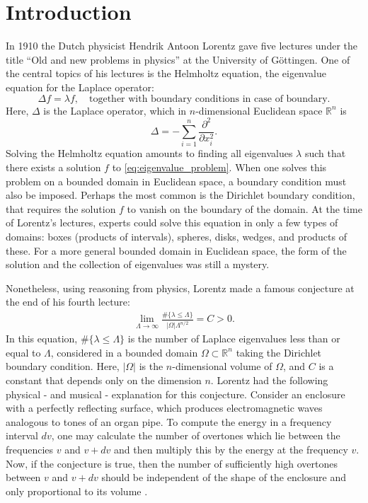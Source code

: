 \documentclass{amsart}
\theoremstyle{definition}
\def\beq{\begin{eqnarray}}
\def\eeq{\end{eqnarray}}
\newcommand*{\R}{\mathbb{R}}
\begin{document}
\section{Introduction} \label{sec:introduction}
In 1910 the Dutch physicist Hendrik Antoon Lorentz gave five lectures under the title ``Old and new problems in physics'' at the University of Göttingen.  One of the central topics of his lectures is the Helmholtz equation, the eigenvalue equation for the Laplace operator:  \begin{equation} \label{eq:eigenvalue_problem}
    \Delta f = \lambda f, \quad \textrm{together with boundary conditions in case of boundary.}
\end{equation}
Here, $\Delta$ is the Laplace operator, which in $n$-dimensional Euclidean space $\R^n$ is 
\begin{equation} \label{eq:Laplace_R^n}
    \Delta = -\sum_{i=1}^n \frac{\partial^2}{\partial x_i^2}.
\end{equation}
Solving the Helmholtz equation amounts to finding all eigenvalues $\lambda$ such that there exists a solution $f$ to \eqref{eq:eigenvalue_problem}.  When one solves this problem on a bounded domain in Euclidean space, a boundary condition must also be imposed.  Perhaps the most common is the Dirichlet boundary condition, that requires the solution $f$ to vanish on the boundary of the domain.  At the time of Lorentz's lectures, experts could solve this equation in only a few types of domains:  boxes (products of intervals), spheres, disks, wedges, and products of these.  For a more general bounded domain in Euclidean space, the form of the solution and the collection of eigenvalues was still a mystery.       

Nonetheless, using reasoning from physics, Lorentz made a famous conjecture at the end of his fourth lecture:  
\beq \lim_{\Lambda \to \infty} \frac{ \# \{ \lambda \leq \Lambda\} }{|\Omega| \Lambda^{n/2}} = C > 0. \label{eq:lorentzs_con} 
\eeq 
In this equation, $\# \{ \lambda \leq \Lambda\}$ is the number of Laplace eigenvalues less than or equal to $\Lambda$, considered in a bounded domain $\Omega \subset \R^n$ taking the Dirichlet boundary condition.  Here, $|\Omega|$ is the $n$-dimensional volume of $\Omega$, and $C$ is a constant that depends only on the dimension $n$.  Lorentz had the following physical - and musical - explanation for this conjecture. Consider an enclosure with a perfectly reflecting surface, which produces electromagnetic waves analogous to tones of an organ pipe. To compute the energy in a frequency interval $dv$, one may calculate the number of overtones which lie between the frequencies $v$ and $v+dv$ and then multiply this by the energy at the frequency $v$. 
Now, if the conjecture is true, then the number of sufficiently high overtones between $v$ and $v+dv$ should be independent of the shape of the enclosure and only proportional to its volume \cite[p. 4]{kac1966can}.
\end{document}
